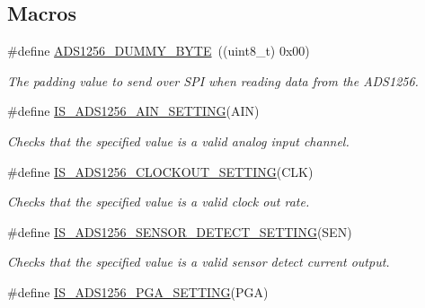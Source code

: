 \subsection*{Macros}
\begin{DoxyCompactItemize}
\item 
\hypertarget{group__ads1256__driver_gab7331aa24935fc439a7064538cd16db5}{\#define \hyperlink{group__ads1256__driver_gab7331aa24935fc439a7064538cd16db5}{A\-D\-S1256\-\_\-\-D\-U\-M\-M\-Y\-\_\-\-B\-Y\-T\-E}~((uint8\-\_\-t) 0x00)}\label{group__ads1256__driver_gab7331aa24935fc439a7064538cd16db5}

\begin{DoxyCompactList}\small\item\em The padding value to send over S\-P\-I when reading data from the A\-D\-S1256. \end{DoxyCompactList}\item 
\hypertarget{group__ads1256__driver_ga655fb9a3125b65a0275bab57496008d3}{\#define \hyperlink{group__ads1256__driver_ga655fb9a3125b65a0275bab57496008d3}{I\-S\-\_\-\-A\-D\-S1256\-\_\-\-A\-I\-N\-\_\-\-S\-E\-T\-T\-I\-N\-G}(A\-I\-N)}\label{group__ads1256__driver_ga655fb9a3125b65a0275bab57496008d3}

\begin{DoxyCompactList}\small\item\em Checks that the specified value is a valid analog input channel. \end{DoxyCompactList}\item 
\hypertarget{group__ads1256__driver_ga33886a7717bd57bc4c1adc81dd78f4d5}{\#define \hyperlink{group__ads1256__driver_ga33886a7717bd57bc4c1adc81dd78f4d5}{I\-S\-\_\-\-A\-D\-S1256\-\_\-\-C\-L\-O\-C\-K\-O\-U\-T\-\_\-\-S\-E\-T\-T\-I\-N\-G}(C\-L\-K)}\label{group__ads1256__driver_ga33886a7717bd57bc4c1adc81dd78f4d5}

\begin{DoxyCompactList}\small\item\em Checks that the specified value is a valid clock out rate. \end{DoxyCompactList}\item 
\hypertarget{group__ads1256__driver_ga6b5e19fd414526c448625765505d8b8c}{\#define \hyperlink{group__ads1256__driver_ga6b5e19fd414526c448625765505d8b8c}{I\-S\-\_\-\-A\-D\-S1256\-\_\-\-S\-E\-N\-S\-O\-R\-\_\-\-D\-E\-T\-E\-C\-T\-\_\-\-S\-E\-T\-T\-I\-N\-G}(S\-E\-N)}\label{group__ads1256__driver_ga6b5e19fd414526c448625765505d8b8c}

\begin{DoxyCompactList}\small\item\em Checks that the specified value is a valid sensor detect current output. \end{DoxyCompactList}\item 
\hypertarget{group__ads1256__driver_gafbb63ded07f35a486351c82902a33b8c}{\#define \hyperlink{group__ads1256__driver_gafbb63ded07f35a486351c82902a33b8c}{I\-S\-\_\-\-A\-D\-S1256\-\_\-\-P\-G\-A\-\_\-\-S\-E\-T\-T\-I\-N\-G}(P\-G\-A)}\label{group__ads1256__driver_gafbb63ded07f35a486351c82902a33b8c}


\end{DoxyCompactItemize}
